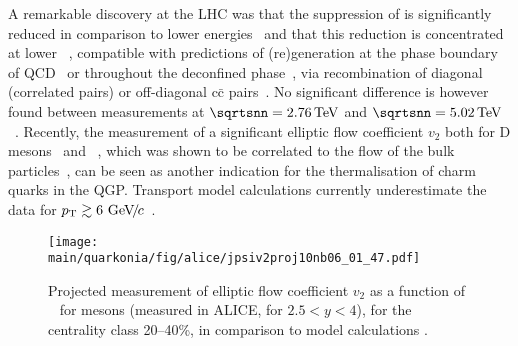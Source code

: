 \documentclass[../report.tex]{subfiles}
\providecommand{\main}{..}
\begin{document}
A remarkable discovery at the LHC was that the suppression of \PJgy is significantly reduced in comparison to lower energies~\cite{Abelev:2012rv} and that this reduction is concentrated at lower \pT~\cite{Abelev:2013ila,Adam:2016rdg}, compatible with predictions of (re)generation at the phase boundary of QCD~\cite{BraunMunzinger:2000px} or throughout the deconfined phase~\cite{Thews:2000rj,Zhao:2011cv,Yan:2006ve}, via recombination of diagonal (correlated pairs) or off-diagonal c$\bar{\text{c}}$ pairs~\cite{Young:2008he}. No significant difference is however found between measurements at $\sqrtsnn = \unit[2.76]{TeV}$ and $\sqrtsnn = \unit[5.02]{TeV}$~\cite{Adam:2016rdg,Sirunyan:2017isk}.
Recently, the measurement of a significant elliptic flow coefficient $v_2$ both for D mesons~\cite{Abelev:2014ipa,Acharya:2017qps,Sirunyan:2017plt} and \PJgy~\cite{Khachatryan:2016ypw,ALICE:2013xna,Acharya:2017tgv,Aaboud:2018ttm}, which was shown to be correlated to the flow of the bulk particles~\cite{Acharya:2018bxo}, can be seen as another indication for the thermalisation of charm quarks in the QGP. Transport model calculations \cite{Zhou:2014kka,Du:2015wha} currently underestimate the data for $p\sb{\scriptstyle\mathrm{T}}\gtrsim 6~\text{GeV}\!/\mspace{-2mu}c$~\cite{Acharya:2017tgv,Khachatryan:2016ypw,Aaboud:2018ttm}.



  
\begin{figure}[h]
\begin{center}
 \texttt{[image: \\main/quarkonia/fig/alice/jpsiv2proj10nb06\_01\_47.pdf]}
\end{center}
 \caption{Projected measurement of elliptic flow coefficient $v_2$ as a function of \pT~ for \PJgy mesons (measured in ALICE, for $2.5<y<4$), for the centrality class 20--40\%, in comparison to model calculations \cite{Du:2015wha}.}
\label{FigQ:v2pTPbPb}
\end{figure}
\end{document}
